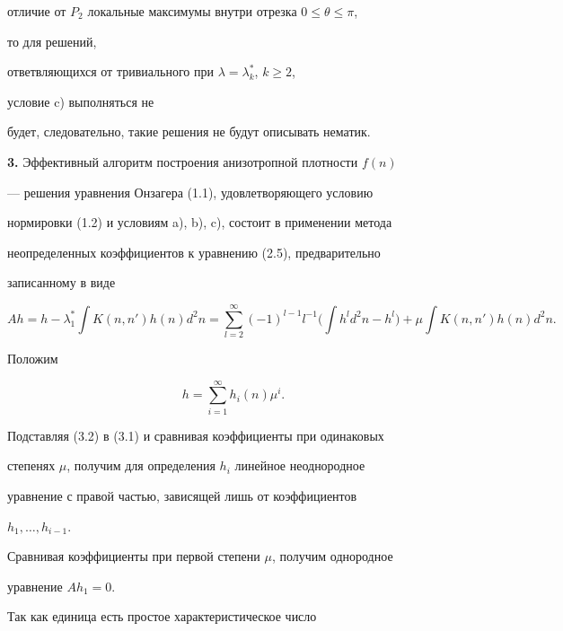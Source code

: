 отличие от $P_2$ локальные максимумы внутри отрезка $0\le\theta\le\pi$,


то для решений,


ответвляющихся от тривиального при $\lambda=\lambda^*_k$, $k\ge 2$,


условие c) выполняться не


будет, следовательно, такие решения не будут описывать нематик.


\medskip





{\bf 3.} Эффективный алгоритм построения анизотропной плотности $f(n)$


--- решения уравнения Онзагера (1.1), удовлетворяющего условию


нормировки (1.2) и условиям a), b), c), состоит в применении метода


неопределенных коэффициентов к уравнению (2.5), предварительно


записанному в виде


\begin{equation}


Ah=h-\lambda^*_1\int K(n,n')h(n)d^2n=


\sum^\infty_{l=2}(-1)^{l-1}l^{-1}\biggl(\int h^l


d^2n-h^l\biggr)+\mu\int K(n,n')h(n)d^2n.


\tag{3.1}


\end{equation}


Положим


\begin{equation}


h=\sum^\infty_{i=1}h_i(n)\mu^i.


\tag{3.2}


\end{equation}


Подставляя (3.2) в (3.1) и сравнивая коэффициенты при одинаковых


степенях $\mu$, получим для определения $h_i$ линейное неоднородное


уравнение с правой частью, зависящей лишь от коэффициентов


$h_1,\dotsc,h_{i-1}$.


Сравнивая коэффициенты при первой степени $\mu$, получим однородное


уравнение $Ah_1=0$.


Так как единица есть простое характеристическое число


